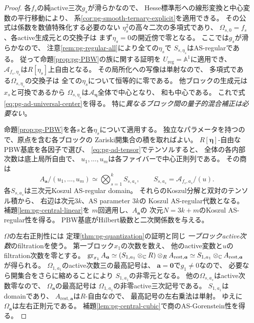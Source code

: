 \begin{proof}
各$f_s$の純active三次$g_s$が滑らかなので、
Hesse標準形への線形変換と中心変数の平行移動により、
系\ref{cor:pg-smooth-ternary-explicit}を適用できる。
その公式は係数を数値特殊化する必要のない
$\eta_s^2$の高々二次の多項式であり、
$\Omega_{s,0}=f_s$、各active生成元との交換子は
まず$\eta_s=0$の開近傍で零となる。
ここでは$g_s$が滑らかなので、
注意\ref{rem:pg-regular-all}により全ての$\eta_s$で
$S_{s,\eta_s}$はAS-regularである。
従って命題\ref{prop:pg-PBW}の族に関する証明を
$U_{\mathrm{reg}}=\mathbb A^1$に適用でき、
$\mathcal A_{f_s,\eta_s}$は$R[\eta_s]$上自由となる。
その局所化への写像は単射なので、
多項式である$\Omega_{s,\eta_s}$の交換子は
全ての$\eta_s$について恒等的に零である。
他ブロックの生成元は$x_s$と可換であるから
$\Omega_{s,\eta_s}$は$\mathcal A_{\boldsymbol\eta}$全体で中心となり、
和も中心である。
これで式\eqref{eq:pg-ad-universal-center}を得る。
特に\emph{異なるブロック間の量子的混合補正は必要ない}。

命題\ref{prop:pg-PBW}を各$s$と各$\eta_s$について適用する。
独立なパラメータを持つので、原点を含む各ブロックの
Zariski開集合の積を取ればよい。
$R[\boldsymbol\eta]$-自由なPBW基底を各因子で選び、
\eqref{eq:pg-ad-tensor}でテンソルすると、
全体の各内部次数は底上局所自由で、
$u_1,\ldots,u_m$は各ファイバーで中心正則列である。
その商は
\begin{equation}
 A_{\boldsymbol a}/(u_1,\ldots,u_m)
 \simeq\bigotimes_{s=1}^k
  S_{s,a_s},\qquad
 S_{s,a_s}=\mathcal A_{f_s,a_s}/(u).
\end{equation}
各$S_{s,a_s}$は三次元Koszul AS-regular domain。
それらのKoszul分解と双対のテンソル積から、
右辺は次元$3k$、AS parameter $3k$の
Koszul AS-regular代数となる。
補題\ref{lem:pg-central-linear}を
$m$回適用し、$A_{\boldsymbol a}$の
次元$N=3k+m$のKoszul AS-regular性を得る。
PBW基底がHilbert級数と二次関係数を与える。

$\Omega$の左右正則性には
定理\ref{thm:pg-quantization}の証明と同じ
\emph{一ブロックactive次数}のfiltrationを使う。
第一ブロック$x_1$の次数を数え、
他のactive変数と$u$のfiltration次数を零とする。
$\operatorname{gr}_{x_1}A_{\boldsymbol a}
\simeq
 (S_{1,a_1}\otimes_\mathbb C R)
 \otimes_R A_{\mathrm{rest},\boldsymbol a}
 \simeq S_{1,a_1}\otimes_\mathbb C A_{\mathrm{rest},\boldsymbol a}$
が得られる。
$\Omega_{1,a_1}$のactive次数三の最高記号は、
$\boldsymbol a=\boldsymbol0$で$g_1\ne0$なので、
必要なら開集合をさらに縮めることにより
$S_{1,a_1}$の非零元となる。
他の$\Omega_{s,a_s}$はactive次数零なので、
$\Omega_{\boldsymbol a}$の最高記号は
$\Omega_{1,a_1}$の非零active三次記号である。
$S_{1,a_1}$はdomainであり、
$A_{\mathrm{rest},\boldsymbol a}$は$R$-自由なので、
最高記号の左右乗法は単射。
ゆえに$\Omega_{\boldsymbol a}$は左右正則元である。
補題\ref{lem:pg-central-cubic}で商のAS-Gorenstein性を得る。


\end{proof}
